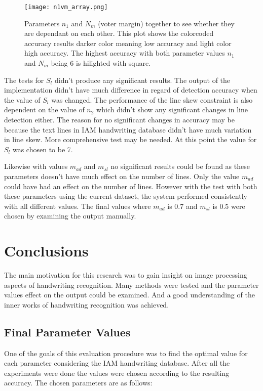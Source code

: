 \documentclass{article}
\begin{document}
    \begin{figure}[!ht]
      \centering
      \texttt{[image: n1vm\_array.png]}
      \caption{Parameters $n_1$ and $N_m$ (voter margin) together to see whether they are dependant on each other. This plot shows the colorcoded accuracy results darker color meaning low accuracy and light color high accuracy. The highest accuracy with both parameter values $n_1$ and $N_m$ being 6 is hilighted with square.
      \label{fig:n1vm}}
    \end{figure}

    The tests for $S_l$ didn't produce any significant results. The output of the implementation didn't have much difference in regard of detection accuracy when the value of $S_l$ was changed. The performance of the line skew constraint is also dependent on the value of $n_2$ which didn't show any significant changes in line detection either. The reason for no significant changes in accuracy may be because the text lines in IAM handwriting database didn't have much variation in line skew. More comprehensive test may be needed. At this point the value for $S_l$ was chosen to be 7.

    Likewise with values $m_{ad}$ and $m_{sl}$ no significant results could be found as these parameters doesn't have much effect on the number of lines. Only the value $m_{ad}$ could have had an effect on the number of lines. However with the test with both these parameters using the current dataset, the system performed consistently with all different values. The final values where $m_{ad}$ is 0.7 and $m_{sl}$ is 0.5 were chosen by examining the output manually.

  \newpage
  \section{Conclusions}
    The main motivation for this research was to gain insight on image processing aspects of handwriting recognition. Many methods were tested and the parameter values effect on the output could be examined. And a good understanding of the inner works of handwriting recognition was achieved.

    \subsection{Final Parameter Values}
      One of the goals of this evaluation procedure was to find the optimal value for each parameter considering the IAM handwriting database. After all the experiments were done the values were chosen according to the resulting accuracy. The chosen parameters are as follows:
\end{document}
